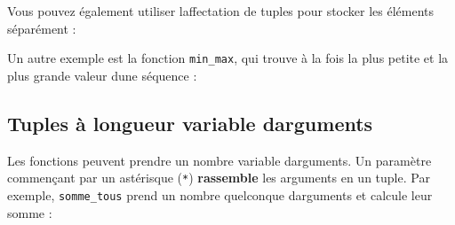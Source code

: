 \begin{Shaded}
\begin{Highlighting}[]
\OperatorTok{\textgreater{}\textgreater{}\textgreater{}}\OperatorTok{=} \NormalTok{(}\NormalTok{, }\NormalTok{)}
\OperatorTok{\textgreater{}\textgreater{}\textgreater{}}
\NormalTok{(}\NormalTok{, }\NormalTok{)}
\end{Highlighting}
\end{Shaded}

Vous pouvez également utiliser l\textquotesingle affectation de tuples
pour stocker les éléments séparément :

\begin{Shaded}
\begin{Highlighting}[]
\OperatorTok{\textgreater{}\textgreater{}\textgreater{}}\OperatorTok{=} \NormalTok{(}\NormalTok{, }\NormalTok{)}
\OperatorTok{\textgreater{}\textgreater{}\textgreater{}}
\OperatorTok{\textgreater{}\textgreater{}\textgreater{}}
\end{Highlighting}
\end{Shaded}

Un autre exemple est la fonction \texttt{min\_max}, qui trouve à la fois
la plus petite et la plus grande valeur d\textquotesingle une séquence :

\begin{Shaded}
\begin{Highlighting}[]
     
\end{Highlighting}
\end{Shaded}

\hypertarget{tuples-uxe0-longueur-variable-darguments}{%
\subsection{Tuples à longueur variable
d\textquotesingle arguments}\label{tuples-uxe0-longueur-variable-darguments}}

Les fonctions peuvent prendre un nombre variable
d\textquotesingle arguments. Un paramètre commençant par un astérisque
(\texttt{*}) \textbf{rassemble} les arguments en un tuple. Par exemple,
\texttt{somme\_tous} prend un nombre quelconque
d\textquotesingle arguments et calcule leur somme :

